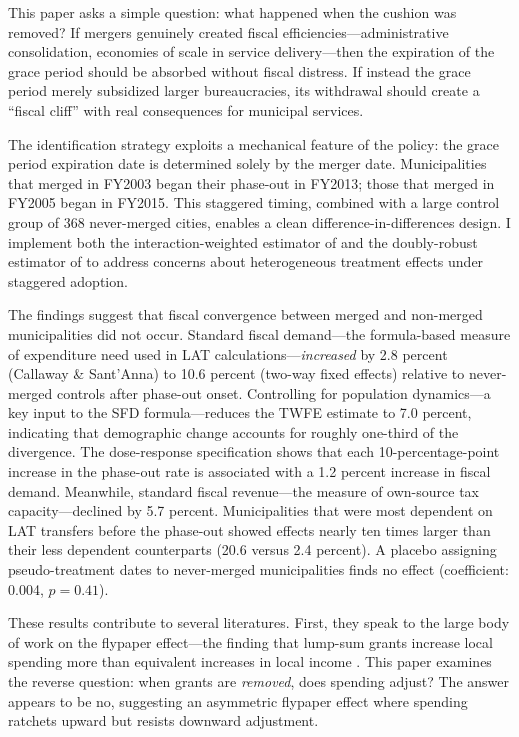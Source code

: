 \documentclass[12pt]{article}
\begin{document}
This paper asks a simple question: what happened when the cushion was removed? If mergers genuinely created fiscal efficiencies---administrative consolidation, economies of scale in service delivery---then the expiration of the grace period should be absorbed without fiscal distress. If instead the grace period merely subsidized larger bureaucracies, its withdrawal should create a ``fiscal cliff'' with real consequences for municipal services.

The identification strategy exploits a mechanical feature of the policy: the grace period expiration date is determined solely by the merger date. Municipalities that merged in FY2003 began their phase-out in FY2013; those that merged in FY2005 began in FY2015. This staggered timing, combined with a large control group of 368 never-merged cities, enables a clean difference-in-differences design. I implement both the interaction-weighted estimator of \citet{sun2021} and the doubly-robust estimator of \citet{callaway2021} to address concerns about heterogeneous treatment effects under staggered adoption.

The findings suggest that fiscal convergence between merged and non-merged municipalities did not occur. Standard fiscal demand---the formula-based measure of expenditure need used in LAT calculations---\emph{increased} by 2.8 percent (Callaway \& Sant'Anna) to 10.6 percent (two-way fixed effects) relative to never-merged controls after phase-out onset. Controlling for population dynamics---a key input to the SFD formula---reduces the TWFE estimate to 7.0 percent, indicating that demographic change accounts for roughly one-third of the divergence. The dose-response specification shows that each 10-percentage-point increase in the phase-out rate is associated with a 1.2 percent increase in fiscal demand. Meanwhile, standard fiscal revenue---the measure of own-source tax capacity---declined by 5.7 percent. Municipalities that were most dependent on LAT transfers before the phase-out showed effects nearly ten times larger than their less dependent counterparts (20.6 versus 2.4 percent). A placebo assigning pseudo-treatment dates to never-merged municipalities finds no effect (coefficient: 0.004, $p = 0.41$).

These results contribute to several literatures. First, they speak to the large body of work on the flypaper effect---the finding that lump-sum grants increase local spending more than equivalent increases in local income \citep{hines1995, inman2008}. This paper examines the reverse question: when grants are \emph{removed}, does spending adjust? The answer appears to be no, suggesting an asymmetric flypaper effect where spending ratchets upward but resists downward adjustment.
\end{document}
